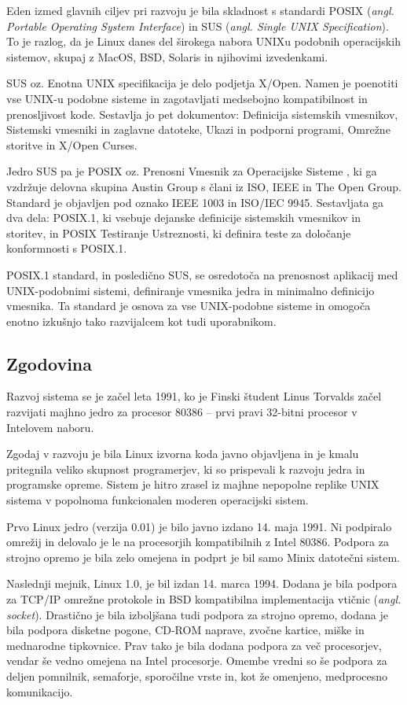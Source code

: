 \documentclass[a4paper,12pt,openright]{book}
\begin{document}
Eden izmed glavnih ciljev pri razvoju je bila skladnost s standardi POSIX (\textit{angl. Portable Operating System Interface}) in SUS (\textit{angl. Single UNIX Specification}).
To je razlog, da je Linux danes del širokega nabora UNIXu podobnih operacijskih sistemov, skupaj z MacOS, BSD, Solaris in njihovimi izvedenkami.

SUS oz. Enotna UNIX specifikacija \cite{SUS_2020} je delo podjetja X/Open. Namen je poenotiti vse UNIX-u podobne sisteme in zagotavljati medsebojno kompatibilnost in prenosljivost kode.
Sestavlja jo pet dokumentov: Definicija sistemskih vmesnikov, Sistemski vmesniki in zaglavne datoteke, Ukazi in podporni programi, Omrežne storitve in X/Open Curses.

Jedro SUS pa je POSIX oz. Prenosni Vmesnik za Operacijske Sisteme \cite{POSIX.1_2024}, ki ga vzdržuje delovna skupina Austin Group s člani iz ISO, IEEE in The Open Group.
Standard je objavljen pod oznako IEEE 1003 in ISO/IEC 9945.
Sestavljata ga dva dela: POSIX.1, ki vsebuje dejanske definicije sistemskih vmesnikov in storitev, in POSIX Testiranje Ustreznosti, ki definira teste za določanje konformnosti s POSIX.1.

POSIX.1 standard, in posledično SUS, se osredotoča na prenosnost aplikacij med UNIX-podobnimi sistemi, definiranje vmesnika jedra in minimalno definicijo vmesnika.
Ta standard je osnova za vse UNIX-podobne sisteme in omogoča enotno izkušnjo tako razvijalcem kot tudi uporabnikom.

\subsection{Zgodovina}

Razvoj sistema se je začel leta 1991, ko je Finski študent Linus Torvalds začel razvijati majhno jedro za procesor 80386 -- prvi pravi 32-bitni procesor v Intelovem naboru.

Zgodaj v razvoju je bila Linux izvorna koda javno objavljena in je kmalu pritegnila veliko skupnost programerjev, ki so prispevali k razvoju jedra in programske opreme.
Sistem je hitro zrasel iz majhne nepopolne replike UNIX sistema v popolnoma funkcionalen moderen operacijski sistem.

Prvo Linux jedro (verzija 0.01) je bilo javno izdano 14. maja 1991. Ni podpiralo omrežij in delovalo je le na procesorjih kompatibilnih z Intel 80386.
Podpora za strojno opremo je bila zelo omejena in podprt je bil samo Minix datotečni sistem.

Naslednji mejnik, Linux 1.0, je bil izdan 14. marca 1994. Dodana je bila podpora za TCP/IP omrežne protokole in BSD kompatibilna implementacija vtičnic (\textit{angl. socket}).
Drastično je bila izboljšana tudi podpora za strojno opremo, dodana je bila podpora disketne pogone, CD-ROM naprave, zvočne kartice, miške in mednarodne tipkovnice.
Prav tako je bila dodana podpora za več procesorjev, vendar še vedno omejena na Intel procesorje.
Omembe vredni so še podpora za deljen pomnilnik, semaforje, sporočilne vrste in, kot že omenjeno, medprocesno komunikacijo.
\end{document}

